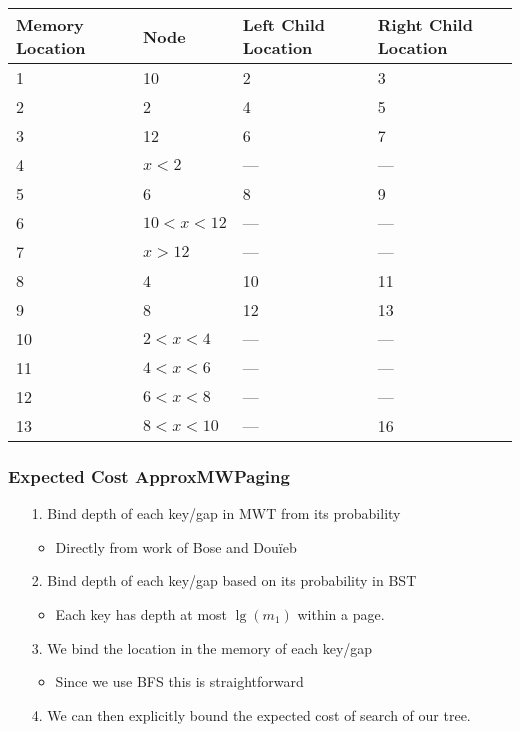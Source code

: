 \documentclass{beamer}
\theoremstyle{plain}
\begin{document}
\begin{frame}[fragile]
{\begin{tiny}
\begin{center}
    \begin{tabular}{ | l | l | l | l |}
    \hline
    Memory Location & Node & Left Child Location & Right Child Location \\ \hline
    1  & 10  & 2    & 3    \\ \hline
    2  & 2  & 4    & 5    \\ \hline
    3  & 12 & 6    & 7    \\ \hline
    4  & $x < 2$  & ---   & ---    \\ \hline
    5  & 6  & 8   & 9   \\ \hline
    6  & $10 < x < 12$ & ---   & ---   \\ \hline
    7  & $x > 12$ & ---   & ---   \\ \hline
    8  & 4  & 10 & 11 \\ \hline
    9  & 8  & 12 & 13 \\ \hline
    10 & $2 < x < 4$  & --- & --- \\ \hline
    11 & $4 < x < 6$  & --- & --- \\ \hline
    12 & $6 < x < 8$  & --- & --- \\ \hline
    13 & $8 < x < 10$ & --- & 16   \\ \hline
    \end{tabular}
\end{center}

\end{tiny}
}

\end{frame}

\begin{frame} \frametitle{Expected Cost ApproxMWPaging} \label{45}
\begin{itemize}
\item[1.] Bind depth of each key/gap in MWT from its probability
\begin{itemize}
\item Directly from work of Bose and Dou\"{i}eb \cite{bose2009efficient}
\end{itemize}
\item[2.] Bind depth of each key/gap based on its probability in BST
\begin{itemize}
\item Each key has depth at most $\lg(m_1)$ within a page.
\end{itemize}
\item[3.] We bind the location in the memory of each key/gap 
\begin{itemize}
\item Since we use BFS this is straightforward
\end{itemize}
\item[4.] We can then explicitly bound the expected cost of search of our tree.
\end{itemize}
\end{frame}
\end{document}
